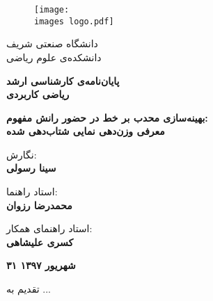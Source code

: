 \documentclass[a4paper,11px]{article}
\begin{document}
\thispagestyle{empty}
\begin{figure}[!hbt]
\centering
\texttt{[image: \\images logo.pdf]}
\centering
\end{figure}

\vspace{-5mm}
\begin{center}
\large
دانشگاه صنعتی شریف\\
دانشکده‌ی علوم ریاضی
\end{center}

\vspace{5mm}
\begin{center}
\large
\textbf{
پایان‌نامه‌ی کارشناسی ارشد\\
ریاضی کاربردی
}
\end{center}


\vspace{5mm}
\begin{center}
\Large
\textbf{
بهینه‌سازی محدب بر خط در حضور رانش مفهوم:\\
معرفی وزن‌دهی نمایی شتاب‌دهی شده
}
\end{center}


\vspace{10mm}
\begin{center}
\large
نگارش:
\\
\textbf{
سینا رسولی
}
\end{center}



\vspace{10mm}
\begin{center}
\large
استاد راهنما:
\\
\textbf{
محمدرضا رزوان
}
\end{center}

\vspace{2mm}

\begin{center}
\large
استاد راهنمای همکار:
\\
\textbf{
کسری علیشاهی
}
\end{center}



\vfill
\begin{center}
\Large \textbf{
۳۱ شهریور ۱۳۹۷
}
\end{center}


\newpage


تقدیم به ...

\newpage
\end{document}
